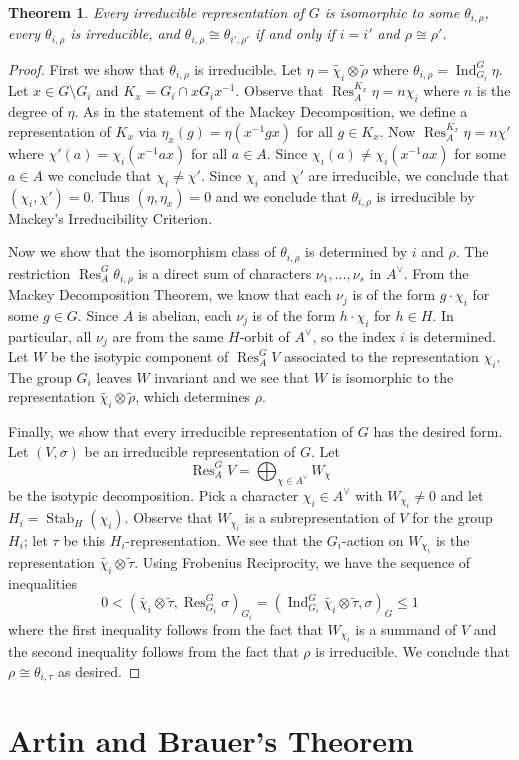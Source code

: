 \documentclass[12pt]{article}
\theoremstyle{plain}
\newtheorem{theorem}{Theorem}[section]
\theoremstyle{definition}
\theoremstyle{remark}
\numberwithin{equation}{section}
\begin{document}
\begin{theorem}
Every irreducible representation of $G$ is isomorphic to some
$\theta_{i,\rho}$,
every $\theta_{i,\rho}$ is irreducible, and
$\theta_{i,\rho} \cong \theta_{i', \rho'}$ if and only if 
$i=i'$ and $\rho \cong \rho'$.
\end{theorem}

\begin{proof}
First we show that $\theta_{i,\rho}$ is irreducible.
Let $\eta = \widetilde{\chi_i} \otimes \widetilde{\rho}$
where $\theta_{i,\rho} = \operatorname{Ind}_{G_i}^G \eta$.
Let $x \in G \setminus G_i$ and $K_x = G_i \cap xG_ix^{-1}$.
Observe that $\operatorname{Res}^{K_x}_A \eta = n\chi_i$
where $n$ is the degree of $\eta$.
As in the statement of the Mackey Decomposition,
we define a representation of $K_x$ via
$\eta_x (g) = \eta(x^{-1}gx)$ for all $g \in K_x$.
Now $\operatorname{Res}^{K_x}_A \eta = n\chi'$
where $\chi'(a) = \chi_i(x^{-1}ax)$ for all $a \in A$.
Since $\chi_i(a) \ne \chi_i(x^{-1}ax)$ for some $a \in A$
we conclude that $\chi_i \ne \chi'$.
Since $\chi_i$ and $\chi'$ are irreducible, we conclude that
$(\chi_i, \chi')=0$.  Thus $(\eta,\eta_x)=0$ and we
conclude that $\theta_{i,\rho}$ is irreducible by Mackey's
Irreducibility Criterion.

Now we show that the isomorphism class of $\theta_{i,\rho}$
is determined by $i$ and $\rho$.
The restriction $\operatorname{Res}^G_A \theta_{i,\rho}$
is a direct sum of characters $\nu_1,\ldots,\nu_s$ in $A^\vee$.
From the Mackey Decomposition Theorem, we know that each
$\nu_j$ is of the form $g \cdot \chi_i$ for some $g \in G$.
Since $A$ is abelian, each $\nu_j$ is of the form $h \cdot \chi_i$
for $h \in H$.  In particular, all $\nu_j$ are from the same $H$-orbit
of $A^\vee$, so the index $i$ is determined.
Let $W$ be the isotypic component of $\operatorname{Res}^G_A V$
associated to the representation $\chi_i$.
The group $G_i$ leaves $W$ invariant and we see that 
$W$ is isomorphic to the representation
$\widetilde{\chi_i} \otimes \widetilde{\rho}$,
which determines $\rho$.

Finally, we show that every irreducible representation of $G$ has the
desired form.  Let $(V, \sigma)$ be an irreducible representation of $G$.
Let
\[
\operatorname{Res}^G_A V = \bigoplus_{\chi \in A^\vee} W_\chi
\]
be the isotypic decomposition.  Pick a character $\chi_i \in A^\vee$
with $W_{\chi_i} \ne 0$ and let $H_i = \operatorname{Stab}_H(\chi_i)$.
Observe that $W_{\chi_i}$ is a subrepresentation of $V$
for the group $H_i$; let $\tau$ be this $H_i$-representation.
We see that the $G_i$-action on $W_{\chi_i}$ is the representation
$\widetilde{\chi_i} \otimes \widetilde{\tau}$.
Using Frobenius Reciprocity, we have the sequence of inequalities
\[
0 < \left( \widetilde{\chi_i} \otimes \widetilde{\tau},
\operatorname{Res}^G_{G_i} \sigma \right)_{G_i}
= \left( \operatorname{Ind}^G_{G_i} \widetilde{\chi_i} \otimes \widetilde{\tau},
\sigma \right)_{G} \le 1
\]
where the first inequality follows from the fact that
$W_{\chi_i}$ is a summand of $V$ and the second inequality
follows from the fact that $\rho$ is irreducible.
We conclude that $\rho \cong \theta_{i,\tau}$ as desired.
\end{proof}

\section{Artin and Brauer's Theorem}





\end{document}
